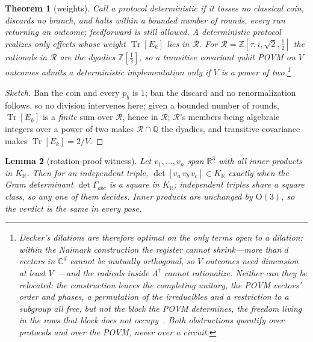 \documentclass[11pt, oneside, openany]{scrbook}
\DeclareMathOperator{\Tr}{Tr}
\newcommand{\C}{\mathbb{C}}
\newcommand{\R}{\mathbb{R}}
\newcommand{\phig}{\tau} %
\newtheorem{theorem}{Theorem}
\newtheorem{lemma}[theorem]{Lemma}
\newenvironment{sketch}{\renewcommand{\qedsymbol}{}\begin{proof}[Sketch]}{\end{proof}}
\begin{document}
\begin{theorem}[weights] \label{thm:weight}
Call a protocol \textit{deterministic} if it tosses no classical coin, discards no branch, and halts within a bounded number of rounds, every run returning an outcome; feedforward is still allowed. A deterministic protocol realizes only effects whose \textit{weight} $\Tr[E_k]$ lies in $\mathcal{R}$. For $\mathcal{R} = \mathbb{Z}[\phig, i, \sqrt{2}, \tfrac{1}{2}]$ the rationals in $\mathcal{R}$ are the dyadics $\mathbb{Z}[\tfrac{1}{2}]$, so a transitive covariant qubit POVM on $V$ outcomes admits a deterministic implementation only if $V$ is a power of two.\footnote{Decker's dilations are therefore optimal on the only terms open to a dilation: within the Naimark construction the register cannot shrink---more than $d$ vectors in $\C^d$ cannot be mutually orthogonal, so $V$ outcomes need dimension at least $V$~\cite[\S2]{decker2005implementationgroupcovariantpositive}---and the radicals inside $A^\dagger$ cannot rationalize. Neither can they be relocated: the construction leaves the completing unitary, the POVM vectors' order and phases, a permutation of the irreducibles and a restriction to a subgroup all free, but not the block the POVM determines, the freedom living in the rows that block does not occupy~\cite[\S5 and Ex.~7]{decker2005implementationgroupcovariantpositive}. Both obstructions quantify over protocols and over the POVM, never over a circuit.}
\end{theorem}

\begin{sketch}
Ban the coin and every $p_b$ is $1$; ban the discard and no renormalization follows, so no division intervenes here; given a bounded number of rounds, $\Tr[E_k]$ is a \textit{finite} sum over $\mathcal{R}$, hence in $\mathcal{R}$; $\mathcal{R}$'s members being algebraic integers over a power of two makes $\mathcal{R} \cap \mathbb{Q}$ the dyadics, and transitive covariance makes $\Tr[E_k] = 2/V$.
\end{sketch}

\begin{lemma}[rotation-proof witness] \label{lem:witness}
Let $v_1,\dots,v_n$ span $\R^3$ with all inner products in $K_\R$. Then for an independent triple, $\det[v_a\,v_b\,v_c] \in K_\R$ exactly when the Gram determinant $\det\Gamma_{abc}$ is a square in $K_\R$; independent triples share a square class, so any one of them decides. Inner products are unchanged by $\mathrm{O}(3)$, so the verdict is the same in every pose.
\end{lemma}
\end{document}
